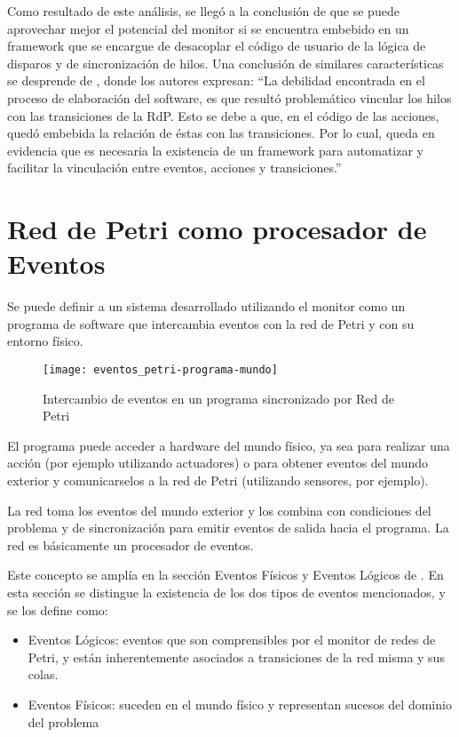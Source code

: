 Como resultado de este análisis, se llegó a la conclusión de que se puede
aprovechar mejor el potencial del monitor si se encuentra embebido en un
framework que se encargue de desacoplar el código de usuario de la lógica de
disparos y de sincronización de hilos. 
Una conclusión de similares características se desprende de
\cite{Bentivegna-Ludemann}, donde los autores expresan: ``La debilidad encontrada en el proceso de elaboración del
software, es que resultó problemático vincular los hilos con las transiciones de
la RdP. Esto se debe a que, en el código de las acciones, quedó embebida la
relación de éstas con las transiciones. Por lo cual, queda en evidencia que es
necesaria la existencia de un framework para automatizar y facilitar la
vinculación entre eventos, acciones y transiciones.''


\section{Red de Petri como procesador de Eventos}
Se puede definir a un sistema desarrollado utilizando el monitor como un
programa de software que intercambia eventos con la red de Petri y con su
entorno físico.

\begin{figure}[h]
	\centering
	\texttt{[image: eventos\_petri-programa-mundo]}
	\caption{Intercambio de eventos en un programa sincronizado por Red de Petri}
	\label{fig:eventos_petri-programa-mundo}
\end{figure}

El programa puede acceder a hardware del mundo físico, ya sea para realizar una
acción (por ejemplo utilizando actuadores) o  para obtener eventos del mundo
exterior y comunicarselos a la red de Petri (utilizando sensores, por ejemplo).

La red toma los eventos del mundo exterior y los combina con condiciones del
problema y de sincronización para emitir eventos de salida hacia el programa. La
red es básicamente un procesador de eventos.\cite{chimp}

Este concepto se amplía en la sección Eventos Físicos y Eventos
Lógicos de \cite{chimp}. En esta sección se distingue la existencia de los dos
tipos de eventos mencionados, y se los define como:
  \begin{itemize}
    \item Eventos Lógicos: eventos que son comprensibles por el monitor de
    redes de Petri, y están inherentemente asociados a transiciones de la red
    misma y sus colas.
    \item Eventos Físicos: suceden en el mundo físico y representan sucesos del
    dominio del problema
  \end{itemize}

